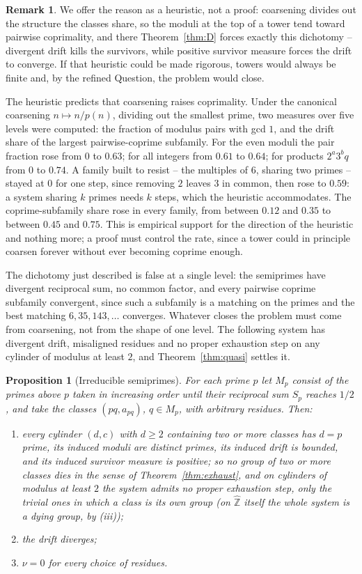 \documentclass[11pt]{article}
\theoremstyle{plain}
\newtheorem{proposition}[theorem]{Proposition}
\theoremstyle{definition}
\newtheorem{remark}[theorem]{Remark}
\newcommand{\Zhat}{\widehat{\mathbb{Z}}}
\begin{document}
\begin{remark}
We offer the reason as a heuristic, not a proof: coarsening
divides out the structure the classes share, so the moduli at
the top of a tower tend toward pairwise coprimality, and there
Theorem~\ref{thm:D} forces exactly this dichotomy -- divergent
drift kills the survivors, while positive survivor measure
forces the drift to converge.  If that heuristic could be made
rigorous, towers would always be finite and, by the refined
Question, the problem would close.

The heuristic predicts that coarsening raises coprimality.  Under
the canonical coarsening $n\mapsto n/p(n)$, dividing out the
smallest prime, two measures over five levels were computed: the
fraction of modulus pairs with gcd $1$, and the drift share of
the largest pairwise-coprime subfamily.  For the even moduli the
pair fraction rose from $0$ to $0.63$; for all integers from
$0.61$ to $0.64$; for products $2^a3^bq$ from $0$ to $0.74$.  A
family built to resist -- the multiples of $6$, sharing two
primes -- stayed at $0$ for one step, since removing $2$ leaves
$3$ in common, then rose to $0.59$: a system sharing $k$ primes
needs $k$ steps, which the heuristic accommodates.  The
coprime-subfamily share rose in every family, from between
$0.12$ and $0.35$ to between $0.45$ and $0.75$.  This is
empirical support for the direction of the heuristic and
nothing more; a proof must control the rate, since a tower
could in principle coarsen forever without ever becoming
coprime enough.

The dichotomy just described is false at a single level: the
semiprimes have divergent reciprocal sum, no common factor, and
every pairwise coprime subfamily convergent, since such a
subfamily is a matching on the primes and the best matching
$6,35,143,\dots$ converges.  Whatever closes the problem must
come from coarsening, not from the shape of one level.  The
following system has divergent drift, misaligned residues and
no proper exhaustion step on any cylinder of modulus at least
$2$, and Theorem~\ref{thm:quasi} settles it.

\begin{proposition}[Irreducible semiprimes]\label{prop:irred}
For each prime $p$ let $M_p$ consist of the primes above $p$
taken in increasing order until their reciprocal sum $S_p$
reaches $1/2$, and take the classes $(pq,a_{pq})$, $q\in M_p$,
with arbitrary residues.  Then:
\begin{enumerate}
\item[(i)] every cylinder $(d,c)$ with $d\ge2$ containing two
or more classes has $d=p$ prime, its induced moduli are distinct
primes, its induced drift is bounded, and its induced survivor
measure is positive; so no group of two or more classes dies
in the sense of Theorem~\ref{thm:exhaust}, and on cylinders of
modulus at least $2$ the system admits no proper exhaustion step,
only the trivial ones in which a class is its own group (on
$\Zhat$ itself the whole system is a dying group, by (iii));
\item[(ii)] the drift diverges;
\item[(iii)] $\nu=0$ for every choice of residues.
\end{enumerate}
\end{proposition}


\end{remark}
\end{document}
